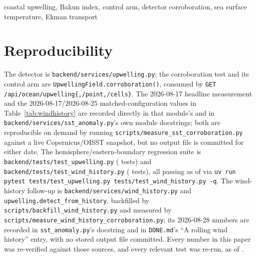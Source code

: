 \documentclass[conference]{IEEEtran}
\begin{document}
\begin{IEEEkeywords}
coastal upwelling, Bakun index, control arm, detector corroboration, sea
surface temperature, Ekman transport
\end{IEEEkeywords}



\section*{Reproducibility}
The detector is \texttt{backend/services/upwelling.py}; the corroboration
test and its control arm are \texttt{UpwellingField.corroboration()},
consumed by \texttt{GET /api/ocean/upwelling\{,/point,/cells\}}. The
2026-08-17 headline measurement and the 2026-08-17/2026-08-25 matched-configuration
values in Table~\ref{tab:windhistory} are recorded directly in that module's
and in \texttt{backend/services/sst\_anomaly.py}'s own module docstrings; both
are reproducible on demand by running \texttt{scripts/measure\_sst\_corroboration.py}
against a live Copernicus/OISST snapshot, but no output file is committed for
either date. The hemisphere/eastern-boundary regression suite is
\texttt{backend/tests/test\_upwelling.py} (\NUpwellingTests{} tests) and
\texttt{backend/tests/test\_wind\_history.py} (\NWindHistoryTests{} tests),
all \NTotalUpwellingTests{} passing as of \AsOf{} via \texttt{uv run pytest
tests/test\_upwelling.py tests/test\_wind\_history.py -q}. The wind-history
follow-up is \texttt{backend/services/wind\_history.py} and
\texttt{upwelling.detect\_from\_history}, backfilled by
\texttt{scripts/backfill\_wind\_history.py} and measured by
\texttt{scripts/measure\_wind\_history\_corroboration.py}; its 2026-08-28
numbers are recorded in \texttt{sst\_anomaly.py}'s docstring and in
\texttt{DONE.md}'s ``A rolling wind history'' entry, with no stored output
file committed. Every number in this paper was re-verified against those
sources, and every relevant test was re-run, as of \AsOf{}.



\end{document}
